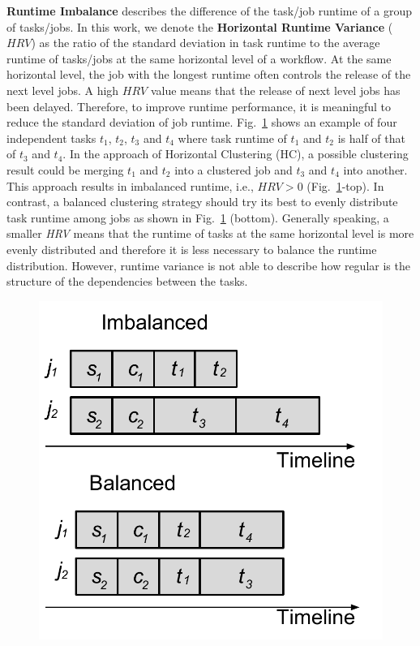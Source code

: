 \documentclass[final]{IEEEtran}
\begin{document}
\textbf{Runtime Imbalance} describes the difference of the task/job runtime of a group of tasks/jobs. In this work, we denote the \textbf{Horizontal Runtime Variance} ($HRV$) as the ratio of the standard deviation in task runtime to the average runtime of tasks/jobs at the same horizontal level of a workflow. At the same horizontal level, the job with the longest runtime often controls the release of the next level jobs. A high $HRV$ value means that the release of next level jobs has been delayed.
Therefore, to improve runtime performance, it is meaningful to reduce the standard deviation of job runtime. Fig.~\ref{fig:rv} shows an example of four independent tasks $t_1$, $t_2$, $t_3$ and $t_4$ where task runtime of $t_1$ and $t_2$ is half of that of $t_3$ and $t_4$. In the approach of Horizontal Clustering (HC), a possible clustering result could be merging $t_1$ and $t_2$ into a clustered job and $t_3$ and $t_4$ into another. This approach results in imbalanced runtime, i.e., $HRV > 0$ (Fig.~\ref{fig:rv}-top). In contrast, a balanced clustering strategy should try its best to evenly distribute task runtime among jobs as shown in Fig.~\ref{fig:rv} (bottom). Generally speaking, a smaller \emph{HRV} means that the runtime of tasks at the same horizontal level is more evenly distributed and therefore it is less necessary to balance the runtime distribution. However, runtime variance is not able to describe how regular is the structure of the dependencies between the tasks.

\begin{figure}[htb]
	\centering
	\includegraphics[width=0.6\linewidth]{figure/rv.pdf}
	\label{fig:rv}
	\vspace{-10pt}
\end{figure}
\end{document}
